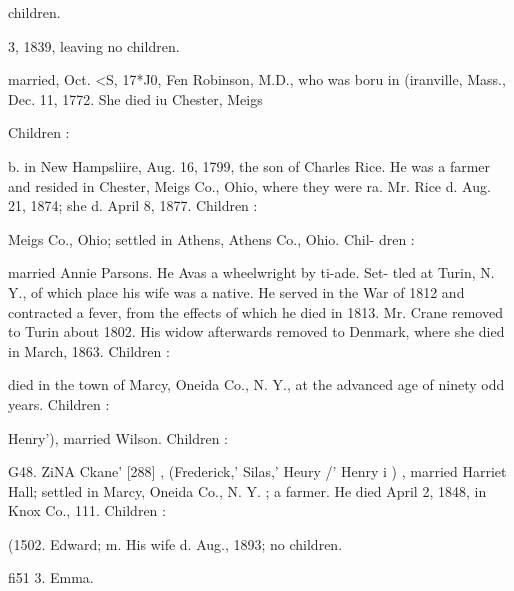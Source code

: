\documentclass[oneside]{book}
\begin{document}
children. 



3, 1839, leaving no children. 

married, Oct. <S, 17*J0, Fen Robinson, M.D., who was boru in 
(iranville, Mass., Dec. 11, 1772. She died iu Chester, Meigs 

Children : 












b. in New Hampsliire, Aug. 16, 1799, the son of Charles Rice. 
He was a farmer and resided in Chester, Meigs Co., Ohio, 
where they were ra. Mr. Rice d. Aug. 21, 1874; she d. April 
8, 1877. Children : 










Meigs Co., Ohio; settled in Athens, Athens Co., Ohio. Chil- 
dren : 









married Annie Parsons. He Avas a wheelwright by ti-ade. Set- 
tled at Turin, N. Y., of which place his wife was a native. He 
served in the War of 1812 and contracted a fever, from the 
effects of which he died in 1813. Mr. Crane removed to Turin 
about 1802. His widow afterwards removed to Denmark, where 
she died in March, 1863. Children : 


died in the town of Marcy, Oneida Co., N. Y., at the advanced 
age of ninety odd years. Children : 











Henry'), married Wilson. Children : 






G48. ZiNA Ckane' [288] , (Frederick,' Silas,' Heury /' Henry i ) , 
married Harriet Hall; settled in Marcy, Oneida Co., N. Y. ; a 
farmer. He died April 2, 1848, in Knox Co., 111. Children : 


(1502. Edward; m. His wife d. Aug., 1893; no children. 

fi51  3. Emma. 
\end{document}
